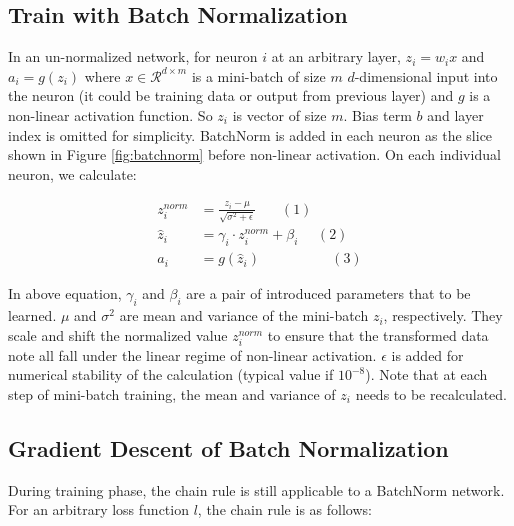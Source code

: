 \documentclass{article}
\begin{document}
\subsection{Train with Batch Normalization}
In an un-normalized network, for neuron $i$ at an arbitrary layer, $z_i=w_ix$ and $a_i=g(z_i)$ where $x\in\mathcal{R}^{d\times m}$ is a mini-batch of size $m$ $d$-dimensional input into the neuron (it could be training data or output from previous layer) and $g$ is a non-linear activation function. So $z_i$ is vector of size $m$. Bias term $b$ and layer index is omitted for simplicity. BatchNorm is added in each neuron as the slice shown in Figure \ref{fig:batchnorm} before non-linear activation. On each individual neuron, we calculate:

\begin{align*}
    z_i^{norm}& = \frac{z_i-\mu}{\sqrt{\sigma^2+\epsilon}}\ \ \ \ \ \ \ \ (1)\\
    \hat{z}_i&= \gamma_i\cdot z_i^{norm}+\beta_i\ \ \ \ \ \ (2)\\
    a_i&=g(\hat{z}_i)\ \ \ \ \ \ \ \ \ \ \ \ \ \ \ \ \ \ \ \ \ \ \ (3)
\end{align*}

In above equation, $\gamma_i$ and $\beta_i$ are a pair of introduced parameters that to be learned. $\mu$ and $\sigma^2$ are mean and variance of the mini-batch $z_i$, respectively. They scale and shift the normalized value $z_i^{norm}$ to ensure that the transformed data note all fall under the linear regime of non-linear activation. $\epsilon$ is added for numerical stability of the calculation (typical value if $10^{-8}$). Note that at each step of mini-batch training, the mean and variance of $z_i$ needs to be recalculated.

\subsection{Gradient Descent of Batch Normalization}

During training phase, the chain rule is still applicable to a BatchNorm network. For an arbitrary loss function $l$, the chain rule is as follows:
\end{document}
